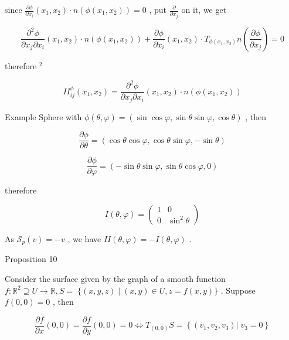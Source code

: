 \documentclass[lang=cn,a4paper,11pt,openany,twoside]{elegantbook}
\begin{document}
since \(\frac{\partial \phi }{\partial {x}_{i}}\left( {{x}_{1},{x}_{2}}\right)  \cdot  n\left( {\phi \left( {{x}_{1},{x}_{2}}\right) }\right)  = 0\) , put \(\frac{\partial }{\partial {x}_{j}}\) on it, we get

\[
\frac{{\partial }^{2}\phi }{\partial {x}_{j}\partial {x}_{i}}\left( {{x}_{1},{x}_{2}}\right)  \cdot  n\left( {\phi \left( {{x}_{1},{x}_{2}}\right) }\right)  + \frac{\partial \phi }{\partial {x}_{i}}\left( {{x}_{1},{x}_{2}}\right)  \cdot  {T}_{\phi \left( {{x}_{1},{x}_{2}}\right) }n\left( \frac{\partial \phi }{\partial {x}_{j}}\right)  = 0
\]

therefore \({}^{2}\)

\[
I{I}_{ij}^{\phi }\left( {{x}_{1},{x}_{2}}\right)  = \frac{{\partial }^{2}\phi }{\partial {x}_{j}\partial {x}_{i}}\left( {{x}_{1},{x}_{2}}\right)  \cdot  n\left( {\phi \left( {{x}_{1},{x}_{2}}\right) }\right)
\]

Example Sphere with \(\phi \left( {\theta ,\varphi }\right)  = \left( {\sin \cos \varphi ,\sin \theta \sin \varphi ,\cos \theta }\right)\) , then

\[
\frac{\partial \phi }{\partial \theta } = \left( {\cos \theta \cos \varphi ,\cos \theta \sin \varphi , - \sin \theta }\right)
\]

\[
\frac{\partial \phi }{\partial \varphi } = \left( {-\sin \theta \sin \varphi ,\sin \theta \cos \varphi ,0}\right)
\]

therefore

\[
I\left( {\theta ,\varphi }\right)  = \left( \begin{matrix} 1 & 0 \\  0 & {\sin }^{2}\theta  \end{matrix}\right)
\]

As \({\mathcal{S}}_{p}\left( v\right)  =  - v\) , we have \({II}\left( {\theta ,\varphi }\right)  =  - I\left( {\theta ,\varphi }\right)\) .

Proposition 10

Consider the surface given by the graph of a smooth function \(f : {\mathbb{R}}^{2} \supseteq  U \rightarrow  \mathbb{R},S = \; \{ \left( {x,y,z}\right)  \mid  \left( {x,y}\right)  \in  U,z = f\left( {x,y}\right) \}\) . Suppose \(f\left( {0,0}\right)  = 0\) , then

\[
\frac{\partial f}{\partial x}\left( {0,0}\right)  = \frac{\partial f}{\partial y}\left( {0,0}\right)  = 0 \Leftrightarrow  {T}_{\left( 0,0\right) }S = \left\{  {\left. \left( {{v}_{1},{v}_{2},{v}_{3}}\right) \right| \;{v}_{3} = 0}\right\}
\]
\end{document}
